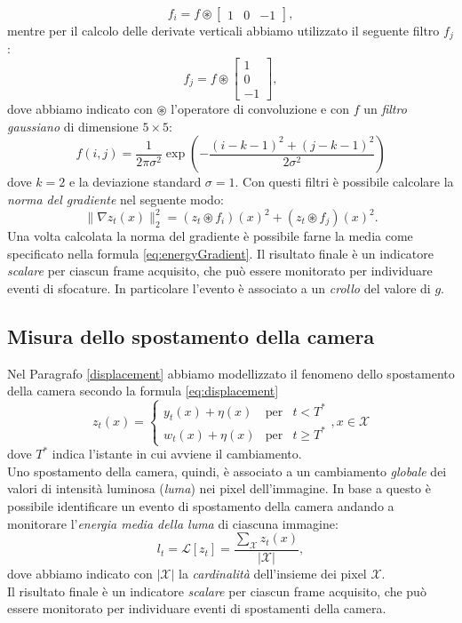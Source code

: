 \[f_i = f \circledast \left[ \begin{array}{rcl}
1 & 0 & -1
\end{array}\right], \] 
mentre per il calcolo delle derivate verticali  abbiamo utilizzato il seguente filtro $f_j$:
\[f_j = f \circledast \left[ \begin{array}{r}
1 \\ 0 \\ -1
\end{array}\right], \]
dove abbiamo indicato con $\circledast$ l'operatore di convoluzione e con $f$ un \textit{filtro gaussiano} di dimensione $5 \times 5$:
\[f(i,j)=\frac{1}{2\pi\sigma^2}\exp\left(-\frac{\left(i-k-1\right)^2+\left(j-k-1\right)^2}{2\sigma^2}\right)\] 
dove $k=2$ e  la deviazione standard $\sigma = 1$.
Con questi filtri \`e possibile calcolare la \textit{norma del gradiente} nel seguente modo:
\[\| \nabla z_t(x) \|_2^2=\left(z_t \circledast f_i\right)(x)^2 + \left(z_t \circledast f_j\right)(x)^2.\]
Una volta calcolata la norma del gradiente \`e possibile farne la media come specificato nella formula \eqref{eq:energyGradient}.
Il risultato finale \`e un indicatore \textit{scalare} per ciascun frame acquisito, che pu\`o essere monitorato per individuare eventi di sfocature. 
In particolare l'evento \`e associato a un \textit{crollo} del valore di $g$.
\subsection{Misura dello spostamento della camera}
Nel Paragrafo \ref{displacement} abbiamo modellizzato il fenomeno dello spostamento della camera secondo la formula \eqref{eq:displacement}
\[z_t(x)  = \left\{ \begin{array}{rcl}
y_t(x) + \eta(x) & \mbox{per} & t < T^* \\
w_t(x) + \eta(x) & \mbox{per} & t \geqslant T^*
\end{array}\right. , x \in \mathcal{X}\]
dove $T^*$ indica l'istante in cui avviene il cambiamento.\\
Uno spostamento della camera, quindi, \`e associato a un cambiamento \textit{globale} dei valori di intensit\`a luminosa (\textit{luma}) nei pixel dell'immagine.
In base a questo \`e possibile identificare un evento di spostamento della camera andando a monitorare l'\textit{energia media della luma} di ciascuna immagine:
\begin{equation}
\label{eq:energyLuma}
l_t = \mathcal{L}[z_t] =\frac{\sum_{\mathcal{X}} z_t(x) }{|\mathcal{X}|} ,
\end{equation}  
dove abbiamo indicato con $|\mathcal{X}|$ la \textit{cardinalit\`a} dell'insieme dei pixel $\mathcal{X}$.\\
Il risultato finale \`e un indicatore \textit{scalare} per ciascun frame acquisito, che pu\`o essere monitorato per individuare eventi di spostamenti della camera. 
